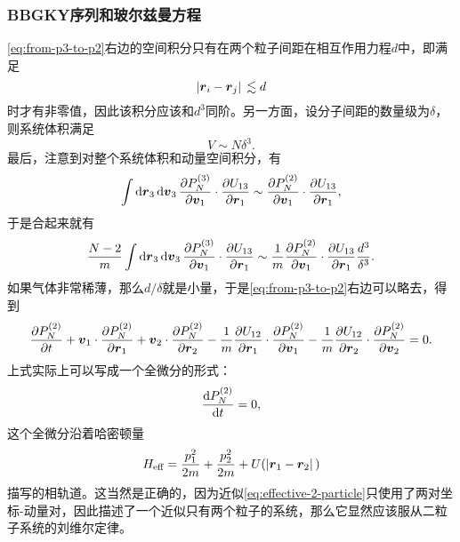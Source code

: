 \documentclass[hyperref, UTF8, a4paper]{ctexart}
\begin{document}
\subsubsection{BBGKY序列和玻尔兹曼方程}

\eqref{eq:from-p3-to-p2}右边的空间积分只有在两个粒子间距在相互作用力程$d$中，即满足
\[
    \abs*{\vb*{r}_i - \vb*{r}_j} \lesssim d
\]
时才有非零值，因此该积分应该和$d^3$同阶。另一方面，设分子间距的数量级为$\delta$，则系统体积满足
\[
    V \sim N \delta^3.
\]
最后，注意到对整个系统体积和动量空间积分，有
\[
    \int \dd{\vb*{r}_3} \dd{\vb*{v}_3} \pdv{P_N^{(3)}}{\vb*{v}_1} \cdot \pdv{U_{13}}{\vb*{r}_1} \sim \pdv{P_N^{(2)}}{\vb*{v}_1} \cdot \pdv{U_{13}}{\vb*{r}_1},
\]
于是合起来就有
\[
    \frac{N-2}{m} \int \dd{\vb*{r}_3} \dd{\vb*{v}_3} \pdv{P_N^{(3)}}{\vb*{v}_1} \cdot \pdv{U_{13}}{\vb*{r}_1} \sim \frac{1}{m} \pdv{P_N^{(2)}}{\vb*{v}_1} \cdot \pdv{U_{13}}{\vb*{r}_1} \frac{d^3}{\delta^3}.
\]
如果气体非常稀薄，那么$d/\delta$就是小量，于是\eqref{eq:from-p3-to-p2}右边可以略去，得到
\begin{equation}
    \pdv{P_N^{(2)}}{t} 
    + \vb*{v}_1 \cdot \pdv{P_N^{(2)}}{\vb*{r}_1} 
    + \vb*{v}_2 \cdot \pdv{P_N^{(2)}}{\vb*{r}_2} 
    - \frac{1}{m} \pdv{U_{12}}{\vb*{r}_1} \cdot \pdv{P_N^{(2)}}{\vb*{v}_1} 
    - \frac{1}{m} \pdv{U_{12}}{\vb*{r}_2} \cdot \pdv{P_N^{(2)}}{\vb*{v}_2} = 0.
    \label{eq:effective-2-particle}
\end{equation}
上式实际上可以写成一个全微分的形式：
\[
    \dv{P_N^{(2)}}{t}=0,
\]
这个全微分沿着哈密顿量
\begin{equation}
    H_\text{eff} = \frac{p_1^2}{2m} + \frac{p_2^2}{2m} + U(\abs*{\vb*{r}_1 - \vb*{r}_2})
    \label{eq:2-particle-hamiltonian}
\end{equation}
描写的相轨道。这当然是正确的，因为近似\eqref{eq:effective-2-particle}只使用了两对坐标-动量对，因此描述了一个近似只有两个粒子的系统，那么它显然应该服从二粒子系统的刘维尔定律。
\end{document}
